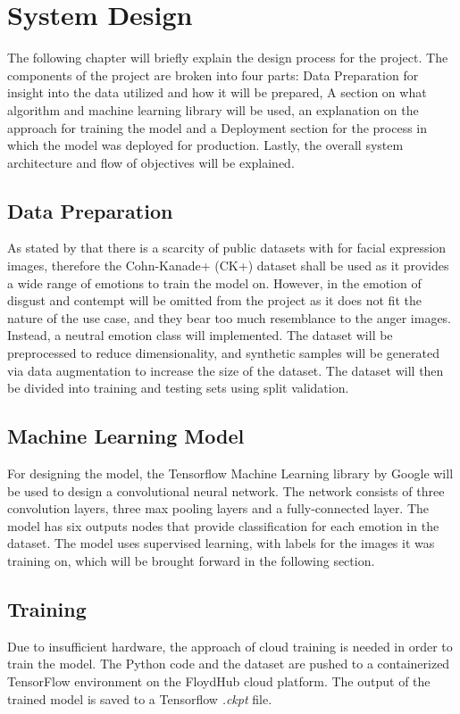 \chapter{System Design}
The following chapter will briefly explain the design process for the project. The components of the project are broken into four parts: Data Preparation for insight into the data utilized and how it will be prepared, A section on what algorithm and machine learning library will be used, an explanation on the approach for training the model and a Deployment section for the process in which the model was deployed for production. Lastly, the overall system architecture and flow of objectives will be explained.

\section{Data Preparation}
As stated by \citeauthor*{LOPES} that there is a scarcity of public datasets with for facial expression images, therefore the Cohn-Kanade+ (CK+) dataset shall be used as it provides a wide range of emotions to train the model on. However, in the emotion of disgust and contempt will be omitted from the project as it does not fit the nature of the use case, and they bear too much resemblance to the anger images. Instead, a neutral emotion class will implemented.
The dataset will be preprocessed to reduce dimensionality, and synthetic samples will be generated via data augmentation to increase the size of the dataset. The dataset will then be divided into training and testing sets using split validation. 

\section{Machine Learning Model}
For designing the model, the Tensorflow Machine Learning library by Google will be used to design a convolutional neural network. 
The network consists of three convolution layers, three max pooling layers and a fully-connected layer. The model has six outputs nodes that provide classification for each emotion in the dataset. The model uses supervised learning, with labels for the images it was training on, which will be brought forward in the following section.\\

\section{Training}
Due to insufficient hardware, the approach of cloud training is needed in order to train the model. The Python code and the dataset are pushed to a containerized TensorFlow environment on the FloydHub cloud platform. The output of the trained model is saved to a Tensorflow \textit{.ckpt} file.

